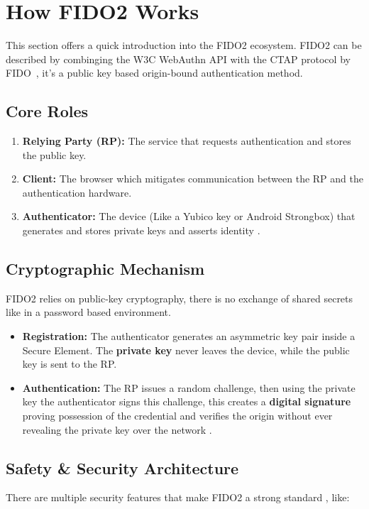 \section{How FIDO2 Works}
This section offers a quick introduction into the FIDO2 ecosystem. FIDO2 can be described by combinging the W3C WebAuthn API with the CTAP protocol by FIDO~\cite{fido2-spec}, it's a public key based origin-bound authentication method.

\subsection{Core Roles}
\begin{enumerate}
  \item \textbf{Relying Party (RP):} The service that requests authentication and stores the public key.
  \item \textbf{Client:} The browser which mitigates communication between the RP and the authentication hardware.
  \item \textbf{Authenticator:} The device (Like a Yubico key or Android Strongbox) that generates and stores private keys and asserts identity \cite{fido2-spec}.
\end{enumerate}

\subsection{Cryptographic Mechanism}
FIDO2 relies on public-key cryptography, there is no exchange of shared secrets like in a password based environment.
\begin{itemize}
    \item \textbf{Registration:} The authenticator generates an asymmetric key pair inside a Secure Element. The \textbf{private key} never leaves the device, while the public key is sent to the RP.
    \item \textbf{Authentication:} The RP issues a random challenge, then using the private key the authenticator signs this challenge, this creates a \textbf{digital signature} proving possession of the credential and verifies the origin without ever revealing the private key over the network \cite{fido2-spec}.
\end{itemize}
\subsection{Safety \& Security Architecture}
There are multiple security features that make FIDO2 a strong standard \cite{fido2-spec}, like:

